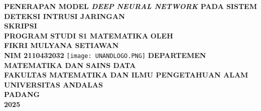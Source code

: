 \documentclass[a4paper,12pt]{report}
\begin{document}
\newcommand{\TTDKajur}[2]{%
   \begin{center}
     \begin{tabular}{c c c}
    Mengetahui, \\[-1em]
    Ketua Departemen\\[2.5em]
    \underline{#1} \\
    [-1.1em]
    {\small{NIP. #2}}
  	 \end{tabular}
   \end{center}
}

\newcommand{\TTDKosong}[4][5cm]{%
  \begin{tabular}{@{}p{#1}@{}}
  \end{tabular}
}

\begin{titlepage}
	\begin{center}
	\renewcommand{\baselinestretch}{2.0}\normalsize
	{\large \textbf{\textbf{PENERAPAN MODEL \textit{DEEP NEURAL NETWORK} PADA SISTEM DETEKSI INTRUSI JARINGAN}}}\\
	\vfill
	{\large \textbf{SKRIPSI}}\\[1ex]
	{\large \textbf{PROGRAM STUDI S1 MATEMATIKA}}
	\vfill
	\textbf{OLEH}\\
	\textbf{{FIKRI MULYANA SETIAWAN}}\\
	\textbf{NIM 2110432032}
	\vfill
	\texttt{[image: UNANDLOGO.PNG]}
	\vfill
	{\textbf{DEPARTEMEN MATEMATIKA DAN SAINS DATA}}\\
	\textbf{FAKULTAS MATEMATIKA DAN ILMU PENGETAHUAN ALAM}\\
	\textbf{UNIVERSITAS ANDALAS}\\
	\textbf{PADANG}\\
	\textbf{2025}
	\end{center} 
\end{titlepage}
\thispagestyle{empty}
%
\newpage
{}
\tableofcontents
\newpage
\newpage
\renewcommand{\baselinestretch}{2.0}\normalsize
{} 
\listoffigures
\newpage
\renewcommand{\baselinestretch}{2.0}\normalsize
{}
\listoftables
\newpage
\renewcommand{\baselinestretch}{2.0}\normalsize
{}
{\listofappendices}
\end{document}
